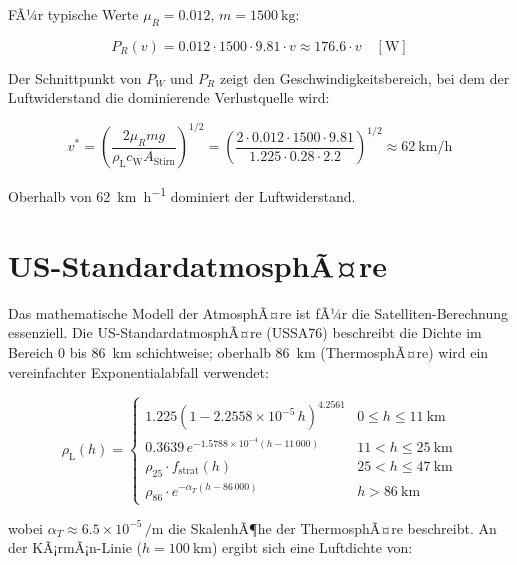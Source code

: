 ﻿\documentclass[12pt, a4paper]{report}
\theoremstyle{definition}
\theoremstyle{remark}
\newcommand{\rhoL}{\rho_{\text{L}}}
\newcommand{\cW}{c_{\text{W}}}
\newcommand{\Astirnfl}{A_{\text{Stirn}}}
\begin{document}
FÃ¼r typische Werte $\mu_R = 0.012$, $m = \SI{1500}{\kilo\gram}$:

\begin{equation}
  P_R(v) = 0.012 \cdot 1500 \cdot 9.81 \cdot v \approx 176.6 \cdot v \quad [\si{\watt}]
  \label{eq:pr_param}
\end{equation}

Der Schnittpunkt von $P_W$ und $P_R$ zeigt den Geschwindigkeitsbereich, bei dem
der Luftwiderstand die dominierende Verlustquelle wird:

\begin{equation}
  v^* = \left(\frac{2\mu_R m g}{\rhoL \cW \Astirnfl}\right)^{1/2}
      = \left(\frac{2 \cdot 0.012 \cdot 1500 \cdot 9.81}{1.225 \cdot 0.28 \cdot 2.2}\right)^{1/2}
      \approx \SI{62}{\kilo\metre\per\hour}
  \label{eq:v_kreuzung}
\end{equation}

Oberhalb von \SI{62}{\kilo\metre\per\hour} dominiert der Luftwiderstand.

\section{US-StandardatmosphÃ¤re}

Das mathematische Modell der AtmosphÃ¤re ist fÃ¼r die Satelliten-Berechnung essenziell.
Die US-StandardatmosphÃ¤re (USSA76) beschreibt die Dichte im Bereich 0 bis \SI{86}{\kilo\metre}
schichtweise; oberhalb \SI{86}{\kilo\metre} (ThermosphÃ¤re) wird ein vereinfachter
Exponentialabfall verwendet:

\begin{equation}
  \rhoL(h) =
  \begin{cases}
    1.225\left(1 - 2.2558 \times 10^{-5}\,h\right)^{4.2561} & 0 \le h \le \SI{11}{\kilo\metre} \\
    0.3639\,e^{-1.5788 \times 10^{-4}(h - 11\,000)} & 11 < h \le \SI{25}{\kilo\metre} \\
    \rho_{25} \cdot f_{\text{strat}}(h) & 25 < h \le \SI{47}{\kilo\metre} \\
    \rho_{86} \cdot e^{-\alpha_T (h - 86\,000)} & h > \SI{86}{\kilo\metre}
  \end{cases}
  \label{eq:ussa76}
\end{equation}

wobei $\alpha_T \approx 6.5 \times 10^{-5}\,\si{\per\metre}$ die SkalenhÃ¶he der
ThermosphÃ¤re beschreibt. An der KÃ¡rmÃ¡n-Linie ($h = \SI{100}{\kilo\metre}$) ergibt
sich eine Luftdichte von:
\end{document}
